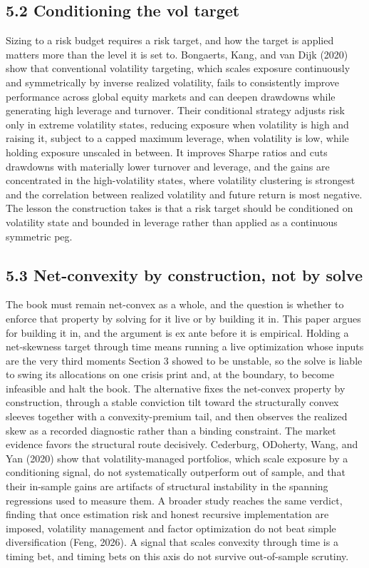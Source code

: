 \documentclass[12pt, a4paper]{article}
\begin{document}
\subsection*{5.2 Conditioning the vol
target}\label{conditioning-the-vol-target}

Sizing to a risk budget requires a risk target, and how the target is
applied matters more than the level it is set to. Bongaerts, Kang, and
van Dijk (2020) show that conventional volatility targeting, which
scales exposure continuously and symmetrically by inverse realized
volatility, fails to consistently improve performance across global
equity markets and can deepen drawdowns while generating high leverage
and turnover. Their conditional strategy adjusts risk only in extreme
volatility states, reducing exposure when volatility is high and raising
it, subject to a capped maximum leverage, when volatility is low, while
holding exposure unscaled in between. It improves Sharpe ratios and cuts
drawdowns with materially lower turnover and leverage, and the gains are
concentrated in the high-volatility states, where volatility clustering
is strongest and the correlation between realized volatility and future
return is most negative. The lesson the construction takes is that a
risk target should be conditioned on volatility state and bounded in
leverage rather than applied as a continuous symmetric peg.

\subsection*{5.3 Net-convexity by construction, not by
solve}\label{net-convexity-by-construction-not-by-solve}

The book must remain net-convex as a whole, and the question is whether
to enforce that property by solving for it live or by building it in.
This paper argues for building it in, and the argument is ex ante before
it is empirical. Holding a net-skewness target through time means
running a live optimization whose inputs are the very third moments
Section 3 showed to be unstable, so the solve is liable to swing its
allocations on one crisis print and, at the boundary, to become
infeasible and halt the book. The alternative fixes the net-convex
property by construction, through a stable conviction tilt toward the
structurally convex sleeves together with a convexity-premium tail, and
then observes the realized skew as a recorded diagnostic rather than a
binding constraint. The market evidence favors the structural route
decisively. Cederburg, O\textquotesingle Doherty, Wang, and Yan (2020)
show that volatility-managed portfolios, which scale exposure by a
conditioning signal, do not systematically outperform out of sample, and
that their in-sample gains are artifacts of structural instability in
the spanning regressions used to measure them. A broader study reaches
the same verdict, finding that once estimation risk and honest recursive
implementation are imposed, volatility management and factor
optimization do not beat simple diversification (Feng, 2026). A signal
that scales convexity through time is a timing bet, and timing bets on
this axis do not survive out-of-sample scrutiny.
\end{document}
